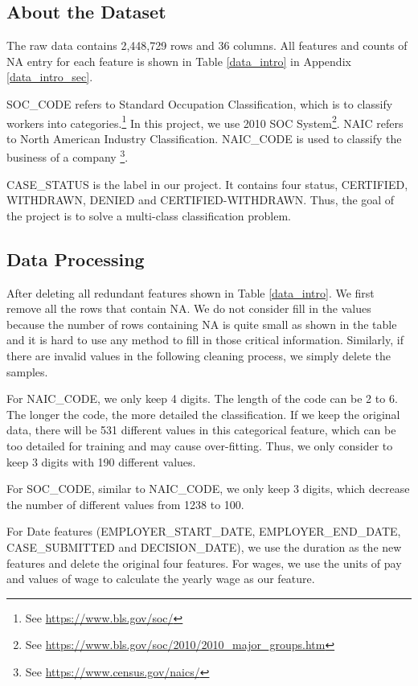 \documentclass{article}
\begin{document}
\begin{multicols}{2}
\subsection{About the Dataset}
The raw data contains 2,448,729 rows and 36 columns. All features and counts of NA entry for each feature is shown in Table \ref{data_intro} in Appendix \ref{data_intro_sec}. 

SOC\_CODE refers to Standard Occupation Classification, which is to classify workers into  categories.\footnote{See \url{https://www.bls.gov/soc/}} In this project, we use 2010 SOC System\footnote{See \url{https://www.bls.gov/soc/2010/2010\_major\_groups.htm}}. NAIC refers to North American Industry Classification. NAIC\_CODE is used to classify the business of a company \footnote{See \url{https://www.census.gov/naics/}}. 

CASE\_STATUS is the label in our project. It contains four status, CERTIFIED, WITHDRAWN, DENIED and CERTIFIED-WITHDRAWN. Thus, the goal of the project is to solve a multi-class classification problem. 

\subsection{Data Processing}
After deleting all redundant features shown in Table \ref{data_intro}. We first remove all the rows that contain NA. We do not consider fill in the values because the number of rows containing NA is quite small as shown in the table and it is hard to use any method to fill in those critical information. Similarly, if there are invalid values in the following cleaning process, we simply delete the samples. 

For NAIC\_CODE, we only keep 4 digits. The length of the code can be 2 to 6. The longer the code, the more detailed the classification. If we keep the original data, there will be 531 different values in this categorical feature, which can be too detailed for training and may cause over-fitting. Thus, we only consider to keep 3 digits with 190 different values. 

For SOC\_CODE, similar to NAIC\_CODE, we only keep 3 digits, which decrease the number of different values from 1238 to 100. 

For Date features (EMPLOYER\_START\_DATE, EMPLOYER\_END\_DATE, CASE\_SUBMITTED and DECISION\_DATE), we use the duration as the new features and delete the original four features. For wages, we use the units of pay and values of wage to calculate the yearly wage as our feature. 


\end{multicols}
\end{document}
